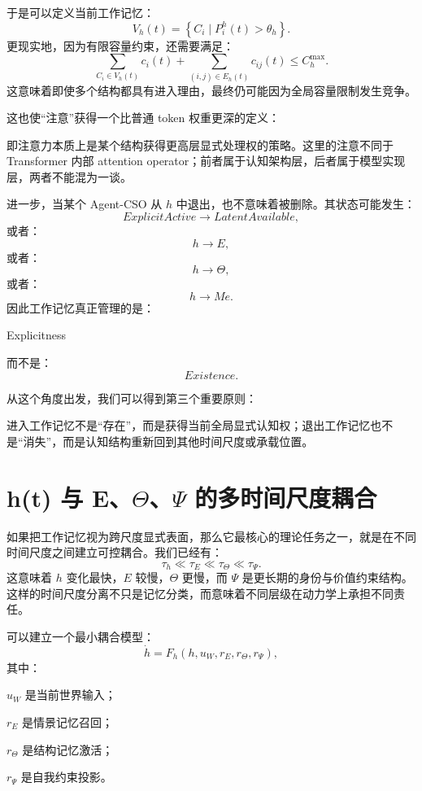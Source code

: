 于是可以定义当前工作记忆：
\[
V_h(t)
=
\left\{
C_i
\mid
P_i^{h}(t)>\theta_h
\right\}.
\]
更现实地，因为有限容量约束，还需要满足：
\[
\sum_{C_i\in V_h(t)}
c_i(t)
+
\sum_{(i,j)\in E_h(t)}
c_{ij}(t)
\leq
C_h^{\max}.
\]
这意味着即使多个结构都具有进入理由，最终仍可能因为全局容量限制发生竞争。

这也使“注意”获得一个比普通 token 权重更深的定义：
\begin{statementbox}
\centering
{}
\end{statementbox}
即注意力本质上是某个结构获得更高层显式处理权的策略。这里的注意不同于 Transformer 内部 attention operator；前者属于认知架构层，后者属于模型实现层，两者不能混为一谈。

进一步，当某个 Agent-CSO 从 $h$ 中退出，也不意味着被删除。其状态可能发生：
\[
ExplicitActive
\rightarrow
LatentAvailable,
\]
或者：
\[
h\rightarrow E,
\]
或者：
\[
h\rightarrow\Theta,
\]
或者：
\[
h\rightarrow Me.
\]
因此工作记忆真正管理的是：
\begin{statementbox}
Explicitness
\end{statementbox}
而不是：
\[
Existence.
\]

从这个角度出发，我们可以得到第三个重要原则：
\begin{proposition*}
进入工作记忆不是“存在”，而是获得当前全局显式认知权；退出工作记忆也不是“消失”，而是认知结构重新回到其他时间尺度或承载位置。
\end{proposition*}

\section{h(t) 与 E、$\Theta$、$\Psi$ 的多时间尺度耦合}

如果把工作记忆视为跨尺度显式表面，那么它最核心的理论任务之一，就是在不同时间尺度之间建立可控耦合。我们已经有：
\[
\tau_h
\ll
\tau_E
\ll
\tau_\Theta
\ll
\tau_\Psi.
\]
这意味着 $h$ 变化最快，$E$ 较慢，$\Theta$ 更慢，而 $\Psi$ 是更长期的身份与价值约束结构。这样的时间尺度分离不只是记忆分类，而意味着不同层级在动力学上承担不同责任。

可以建立一个最小耦合模型：
\[
\dot h
=
F_h
\left(
h,
u_W,
r_E,
r_\Theta,
r_\Psi
\right),
\]
其中：

$u_W$ 是当前世界输入；

$r_E$ 是情景记忆召回；

$r_\Theta$ 是结构记忆激活；

$r_\Psi$ 是自我约束投影。

